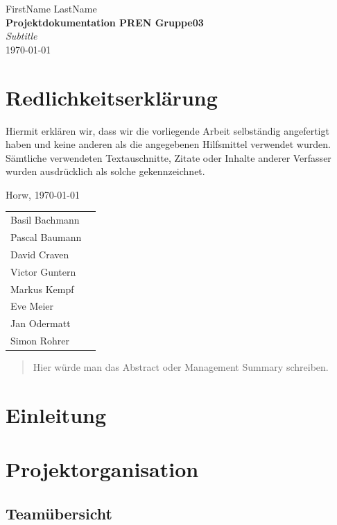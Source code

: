 \documentclass[a4paper]{report}
\newcommand*{\titleAP}{\begingroup %
	\centering
	\vspace*{\baselineskip} %

	{\Large FirstName LastName}\\[0.167\textheight] %

	{\Huge\bfseries Projektdokumentation PREN Gruppe03}\\[\baselineskip]

	{\Large \textit{Subtitle}}\\
	\today

	\vspace*{3\baselineskip} %
	\endgroup}
\begin{document}
\titleAP

\newpage

\chapter*{Redlichkeitserklärung}
Hiermit erklären wir, dass wir die vorliegende Arbeit selbständig angefertigt haben und keine anderen als die angegebenen Hilfsmittel verwendet wurden. Sämtliche verwendeten Textauschnitte, Zitate oder Inhalte anderer Verfasser wurden ausdrücklich als solche gekennzeichnet.

\vspace{1.5em}

\noindent
Horw, \today

\vspace{2em}

\noindent
\begin{tabular}{lp{}}
	Basil Bachmann & \\[1em]
	\cline{2-2}
	Pascal Baumann &  \\[1em]
	\cline{2-2}
	David Craven & \\[1em]
	\cline{2-2}
	Victor Guntern & \\[1em]
	\cline{2-2}
	Markus Kempf & \\[1em]
	\cline{2-2}
	Eve Meier & \\[1em]
	\cline{2-2}
	Jan Odermatt & \\[1em]
	\cline{2-2}
	Simon Rohrer &  \\[1em]
	\cline{2-2}
\end{tabular}

\newpage

\begin{abstract}
	Hier würde man das Abstract oder Management Summary schreiben.
\end{abstract}

\tableofcontents

\newpage

\chapter{Einleitung}
\label{ch:Intro}

\chapter{Projektorganisation}

\section{Teamübersicht}
\end{document}
